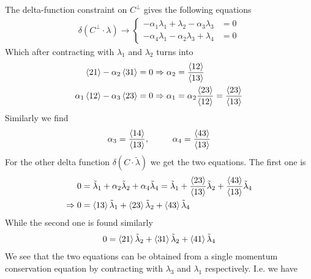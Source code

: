 \documentclass[letter,11pt]{article}
\begin{document}
The delta-function constraint on $C^\perp$ gives the following equations
\begin{equation}
	\begin{aligned}
		\delta(C^\perp\cdot \lambda)\rightarrow\begin{cases}
			-\alpha_1\lambda_1+\lambda_2-\alpha_3\lambda_3&=0\\
			-\alpha_4\lambda_1-\alpha_2\lambda_3+\lambda_4&=0
		\end{cases}
	\end{aligned}
\end{equation}
Which after contracting with $\lambda_1$ and $\lambda_2$ turns into
\begin{equation}
	\begin{aligned}
		\expval{21} -\alpha_2 \expval{31}&=0\Rightarrow\alpha_2=\frac{\expval{12}}{\expval{13}}\\
		\alpha_1\expval{12} -\alpha_3\expval{23}&=0 \Rightarrow\alpha_1=\alpha_2\frac{\expval{23}}{\expval{12}}=\frac{\expval{23}}{\expval{13}}
	\end{aligned}
\end{equation}
Similarly we find
\begin{equation}
	\begin{aligned}
		\alpha_3=\frac{\expval{14}}{\expval{13}},~~~~~~~~\alpha_4=\frac{\expval{43}}{\expval{13}}
	\end{aligned}
\end{equation}
For the other delta function $\delta(C\cdot \tilde\lambda)$ we get the two equations. The first one is
\begin{equation}
	\begin{aligned}
		0&=\tilde\lambda_1+\alpha_2\tilde\lambda_2+\alpha_4\tilde\lambda_4=\tilde\lambda_1+\frac{\expval{23}}{\expval{13}}\tilde\lambda_2+\frac{\expval{43}}{\expval{13}}\tilde\lambda_4\\
		\Rightarrow 0&=\expval{13}\tilde\lambda_1+\expval{23}\tilde\lambda_2+\expval{43}\tilde\lambda_4
	\end{aligned}
\end{equation}
While the second one is found similarly
\begin{equation}
	\begin{aligned}
		0=\expval{21}\tilde\lambda_2+\expval{31}\tilde\lambda_2+\expval{41}\tilde\lambda_4
	\end{aligned}
\end{equation}
We see that the two equations can be obtained from a single momentum conservation equation by contracting with $\lambda_3$ and $\lambda_1$ respectively. I.e. we have
\end{document}
